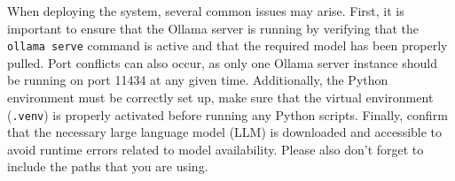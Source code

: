When deploying the system, several common issues may arise. First, it is important to ensure that the Ollama server is running by verifying that the \texttt{ollama serve} command is active and that the required model has been properly pulled.
Port conflicts can also occur, as only one Ollama server instance should be running on port 11434 at any given time. Additionally, the Python environment must be correctly set up, make sure that the virtual environment (\texttt{.venv}) is properly activated before running any Python scripts.
Finally, confirm that the necessary large language model (LLM) is downloaded and accessible to avoid runtime errors related to model availability. Please also don't forget to include the paths that you are using.
